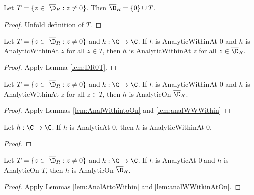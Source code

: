 \begin{lemma} \label{lem:DR0T} 
\leanok
Let $T=\{z\in\ \overline{\D}_R : z\neq0\}$. Then $\overline{\D}_R = \{0\}\cup T$.
\end{lemma}
\begin{proof}
\leanok
Unfold definition of $T$.
\end{proof}


\begin{lemma} \label{lem:analWWWithin} 
\leanok
Let $T=\{z\in\ \overline{\D}_R : z\neq0\}$ and $h: \C\to\C$. If $h$ is AnalyticWithinAt $0$ and $h$ is AnalyticWithinAt $z$ for all $z\in T$, then $h$ is AnalyticWithinAt $z$ for all $z\in \overline{\D}_R$.
\end{lemma}
\begin{proof}
\leanok
{}
Apply Lemma \ref{lem:DR0T}.
\end{proof}

\begin{lemma} \label{lem:analWWithinAtOn} 
\leanok
Let $T=\{z\in\ \overline{\D}_R : z\neq0\}$ and $h: \C\to\C$. If $h$ is AnalyticWithinAt $0$ and $h$ is AnalyticWithinAt $z$ for all $z\in T$, then $h$ is AnalyticOn $\overline{\D}_R$.
\end{lemma}
\begin{proof}
\leanok
{}
Apply Lemmas \ref{lem:AnalWithintoOn} and \ref{lem:analWWWithin}
\end{proof}



\begin{lemma}[At to within] \label{lem:AnalAttoWithin} 
\leanok
Let $h:\C\to\C$. If $h$ is AnalyticAt $0$,
then $h$ is AnalyticWithinAt $0$.
\end{lemma}
\begin{proof}
\leanok
\end{proof}

\begin{lemma} \label{lem:analAtOnOn} 
\leanok
Let $T=\{z\in\ \overline{\D}_R : z\neq0\}$ and $h: \C\to\C$. If $h$ is AnalyticAt $0$ and $h$ is AnalyticOn $T$, then $h$ is AnalyticOn $\overline{\D}_R$.
\end{lemma}
\begin{proof}
\leanok
{}
Apply Lemmas \ref{lem:AnalAttoWithin} and \ref{lem:analWWithinAtOn}.
\end{proof}


